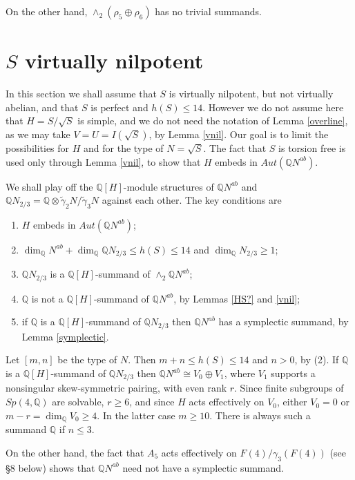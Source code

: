 \documentclass[12pt]{amsart}
\renewcommand{\geq}{\geqslant}
\renewcommand{\leq}{\leqslant}
\begin{document}
On the other hand, $\wedge_2(\rho_5\oplus\rho_6)$ has  no trivial summands.


\section{$S$ virtually nilpotent}

In this section we shall assume that $S$ is virtually nilpotent,
but not virtually abelian, and that $S$ is perfect and $h(S)\leq14$.
However we do not assume here that $H=S/\sqrt{S}$ is simple,
and we do not need the notation of Lemma \ref{overline},
as we may take $V=U=I(\sqrt{S})$, by Lemma \ref{vnil}.
Our goal is to limit the possibilities for $H$ and for
the type of $N=\sqrt{S}$.
The fact that $S$ is torsion free is used only through Lemma \ref{vnil},
to show that $H$ embeds in $Aut(\mathbb{Q}N^{ab})$.

We shall play off the $\mathbb{Q}[H]$-module structures of $\mathbb{Q}N^{ab}$
and $\mathbb{Q}N_{2/3}=\mathbb{Q}\otimes\tilde\gamma_2N/\tilde\gamma_3N$ 
against each other.
The key conditions are
\begin{enumerate}
\item$H$ embeds in $Aut(\mathbb{Q}N^{ab})$;
\item$\dim_\mathbb{Q}N^{ab}+\dim_\mathbb{Q}\mathbb{Q}N_{2/3}\leq{h(S)}\leq14$ 
and  $\dim_\mathbb{Q}N_{2/3}\geq1$;
\item$\mathbb{Q}N_{2/3}$ is a $\mathbb{Q}[H]$-summand of $\wedge_2\mathbb{Q}N^{ab}$;
\item{}$\mathbb{Q}$ is not a $\mathbb{Q}[H]$-summand of $\mathbb{Q}N^{ab}$,
by Lemmas \ref{HS?} and \ref{vnil};
\item{}if $\mathbb{Q}$ is a $\mathbb{Q}[H]$-summand of $\mathbb{Q}N_{2/3}$ then
$\mathbb{Q}N^{ab}$ has a symplectic summand, by Lemma \ref{symplectic}.
\end{enumerate}

Let $[m,n]$ be the type of $N$.
Then $m+n\leq{h(S)}\leq14$ and $n>0$, by (2).
If $ \mathbb{Q}$ is a $\mathbb{Q}[H]$-summand of $\mathbb{Q}N_{2/3}$ 
then $\mathbb{Q}N^{ab}\cong{V_0}\oplus{V_1}$,
where $V_1$ supports a nonsingular skew-symmetric pairing,
with even rank $r$. 
Since finite subgroups of $Sp(4,\mathbb{Q})$ are solvable, $r\geq6$,
and since $H$ acts effectively on $V_0$,
either $V_0=0$ or $m-r=\dim_\mathbb{Q}V_0\geq4$.
In the latter case $m\geq10$.
There is always such a summand $\mathbb{Q}$ if $n\leq3$.

On the other hand,
the fact that $A_5$ acts effectively on $F(4)/\gamma_3(F(4))$ 
(see \S8 below) shows that 
$\mathbb{Q}N^{ab}$ need not have a symplectic summand.
\end{document}

